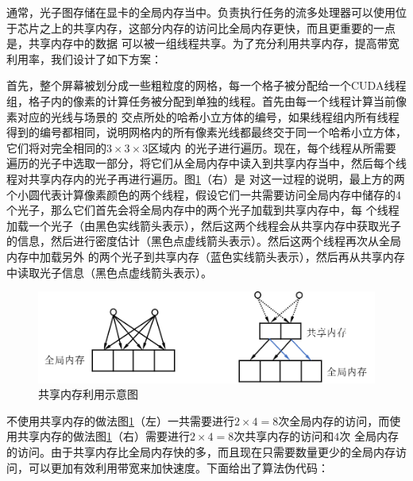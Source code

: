 \documentclass[UTF8]{ctexart}
\begin{document}
        通常，光子图存储在显卡的全局内存当中。负责执行任务的流多处理器可以使用位于芯片之上的共享内存，这部分内存的访问比全局内存更快，而且更重要的一点是，共享内存中的数据
        可以被一组线程共享。为了充分利用共享内存，提高带宽利用率，我们设计了如下方案：
        
        首先，整个屏幕被划分成一些粗粒度的网格，每一个格子被分配给一个CUDA线程组，格子内的像素的计算任务被分配到单独的线程。首先由每一个线程计算当前像素对应的光线与场景的
        交点所处的哈希小立方体的编号，如果线程组内所有线程得到的编号都相同，说明网格内的所有像素光线都最终交于同一个哈希小立方体，它们将对完全相同的$3\times3\times3$区域内
        的光子进行遍历。现在，每个线程从所需要遍历的光子中选取一部分，将它们从全局内存中读入到共享内存当中，然后每个线程对共享内存内的光子再进行遍历。图\ref{fig:5}（右）是
        对这一过程的说明，最上方的两个小圆代表计算像素颜色的两个线程，假设它们一共需要访问全局内存中储存的4个光子，那么它们首先会将全局内存中的两个光子加载到共享内存中，每
        个线程加载一个光子（由黑色实线箭头表示），然后这两个线程会从共享内存中获取光子的信息，然后进行密度估计（黑色点虚线箭头表示）。然后这两个线程再次从全局内存中加载另外
        的两个光子到共享内存（蓝色实线箭头表示），然后再从共享内存中读取光子信息（黑色点虚线箭头表示）。
        
        \begin{figure}[htbp]
        \centering
        \includegraphics[scale=0.7]{pic/SharedMemory.png}
        \caption{共享内存利用示意图}
        \label{fig:5}
        \end{figure}
        
        不使用共享内存的做法图\ref{fig:5}（左）一共需要进行$2\times4=8$次全局内存的访问，而使用共享内存的做法图\ref{fig:5}（右）需要进行$2\times4=8$次共享内存的访问和$4$次
        全局内存的访问。由于共享内存比全局内存快的多，而且现在只需要数量更少的全局内存访问，可以更加有效利用带宽来加快速度。下面给出了算法伪代码：
        
        \renewcommand{\algorithmicrequire}{\textbf{Input:}} 
        \renewcommand{\algorithmicensure}{\textbf{Output:}}
        
\end{document}
